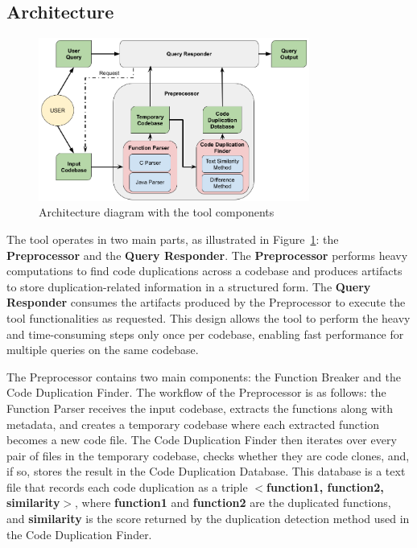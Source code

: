 \documentclass[conference]{IEEEtran}
\begin{document}
\subsection{Architecture}

\begin{figure}[ht]
\centering
\includegraphics[width=3.5in]{fig/diagrama_mestrado.png}
\caption{Architecture diagram with the tool components}
\label{fig:diagram}
\end{figure}

The tool operates in two main parts, as illustrated in Figure~\ref{fig:diagram}: the \textbf{Preprocessor} and the \textbf{Query Responder}. 
The \textbf{Preprocessor} performs heavy computations to find code 
duplications across a codebase and produces artifacts to store duplication-related information 
in a structured form. The \textbf{Query Responder} consumes the artifacts produced 
by the Preprocessor to execute the tool functionalities as requested. This design allows the 
tool to perform the heavy and time-consuming steps only once per codebase, enabling fast performance 
for multiple queries on the same codebase.

The Preprocessor contains two main components: the Function Breaker and the Code Duplication Finder. 
The workflow of the Preprocessor is as follows: the Function Parser receives the input codebase, extracts the functions along with metadata, and creates a temporary codebase where each extracted function becomes a new code file. The Code Duplication Finder then iterates over every pair of files 
in the temporary codebase, checks whether they are code clones, and, if so, stores the result in 
the Code Duplication Database. This database is a text file that records each code duplication as a triple 
\textbf{$<$function1, function2, similarity$>$}, where \textbf{function1} and \textbf{function2} are the 
duplicated functions, and \textbf{similarity} is the score returned by the duplication detection method 
used in the Code Duplication Finder.
\end{document}
